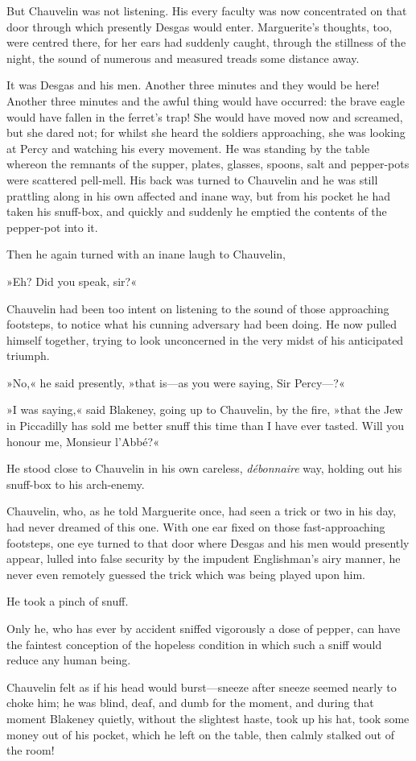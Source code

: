 But Chauvelin was not listening. His every faculty was now concentrated on that door through which presently Desgas would enter. Marguerite's thoughts, too, were centred there, for her ears had suddenly caught, through the stillness of the night, the sound of numerous and measured treads some distance away.

It was Desgas and his men. Another three minutes and they would be here! Another three minutes and the awful thing would have occurred: the brave eagle would have fallen in the ferret's trap! She would have moved now and screamed, but she dared not; for whilst she heard the soldiers approaching, she was looking at Percy and watching his every movement. He was standing by the table whereon the remnants of the supper, plates, glasses, spoons, salt and pepper-pots were scattered pell-mell. His back was turned to Chauvelin and he was still prattling along in his own affected and inane way, but from his pocket he had taken his snuff-box, and quickly and suddenly he emptied the contents of the pepper-pot into it.

Then he again turned with an inane laugh to Chauvelin,\longdash


»Eh? Did you speak, sir?«

Chauvelin had been too intent on listening to the sound of those approaching footsteps, to notice what his cunning adversary had been doing. He now pulled himself together, trying to look unconcerned in the very midst of his anticipated triumph.

»No,« he said presently, »that is\allowbreak---\allowbreak as you were saying, Sir Percy\allowbreak---\allowbreak ?«

»I was saying,« said Blakeney, going up to Chauvelin, by the fire, »that the Jew in Piccadilly has sold me better snuff this time than I have ever tasted. Will you honour me, Monsieur l'Abbé?«

He stood close to Chauvelin in his own careless, \textit{débonnaire} way, holding out his snuff-box to his arch-enemy.

Chauvelin, who, as he told Marguerite once, had seen a trick or two in his day, had never dreamed of this one. With one ear fixed on those fast-approaching footsteps, one eye turned to that door where Desgas and his men would presently appear, lulled into false security by the impudent Englishman's airy manner, he never even remotely guessed the trick which was being played upon him.

He took a pinch of snuff.

Only he, who has ever by accident sniffed vigorously a dose of pepper, can have the faintest conception of the hopeless condition in which such a sniff would reduce any human being.

Chauvelin felt as if his head would burst\allowbreak---\allowbreak sneeze after sneeze seemed nearly to choke him; he was blind, deaf, and dumb for the moment, and during that moment Blakeney quietly, without the slightest haste, took up his hat, took some money out of his pocket, which he left on the table, then calmly stalked out of the room!